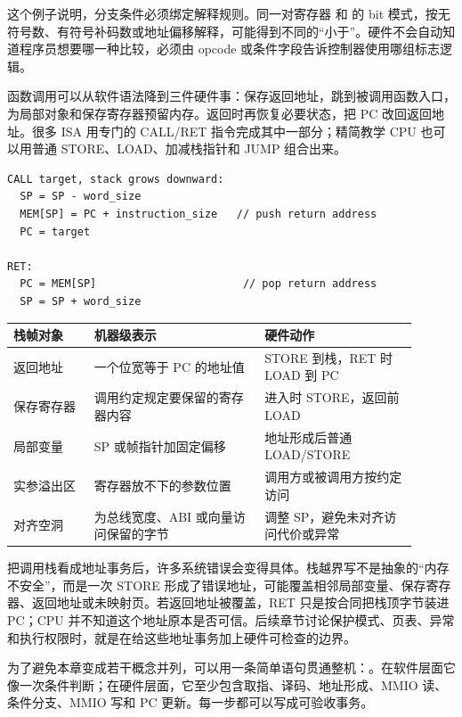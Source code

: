 这个例子说明，分支条件必须绑定解释规则。同一对寄存器  和  的 bit 模式，按无符号数、有符号补码数或地址偏移解释，可能得到不同的“小于”。硬件不会自动知道程序员想要哪一种比较，必须由 opcode 或条件字段告诉控制器使用哪组标志逻辑。

函数调用可以从软件语法降到三件硬件事：保存返回地址，跳到被调用函数入口，为局部对象和保存寄存器预留内存。返回时再恢复必要状态，把 PC 改回返回地址。很多 ISA 用专门的 CALL/RET 指令完成其中一部分；精简教学 CPU 也可以用普通 STORE、LOAD、加减栈指针和 JUMP 组合出来。

\begin{lstlisting}
CALL target, stack grows downward:
  SP = SP - word_size
  MEM[SP] = PC + instruction_size   // push return address
  PC = target

RET:
  PC = MEM[SP]                       // pop return address
  SP = SP + word_size
\end{lstlisting}

\begin{longtable}{L{0.18\linewidth}L{0.38\linewidth}L{0.34\linewidth}}
\toprule
栈帧对象 & 机器级表示 & 硬件动作 \\
\midrule
返回地址 & 一个位宽等于 PC 的地址值 & STORE 到栈，RET 时 LOAD 到 PC \\
保存寄存器 & 调用约定规定要保留的寄存器内容 & 进入时 STORE，返回前 LOAD \\
局部变量 & SP 或帧指针加固定偏移 & 地址形成后普通 LOAD/STORE \\
实参溢出区 & 寄存器放不下的参数位置 & 调用方或被调用方按约定访问 \\
对齐空洞 & 为总线宽度、ABI 或向量访问保留的字节 & 调整 SP，避免未对齐访问代价或异常 \\
\bottomrule
\end{longtable}

把调用栈看成地址事务后，许多系统错误会变得具体。栈越界写不是抽象的“内存不安全”，而是一次 STORE 形成了错误地址，可能覆盖相邻局部变量、保存寄存器、返回地址或未映射页。若返回地址被覆盖，RET 只是按合同把栈顶字节装进 PC；CPU 并不知道这个地址原本是否可信。后续章节讨论保护模式、页表、异常和执行权限时，就是在给这些地址事务加上硬件可检查的边界。

为了避免本章变成若干概念并列，可以用一条简单语句贯通整机：。在软件层面它像一次条件判断；在硬件层面，它至少包含取指、译码、地址形成、MMIO 读、条件分支、MMIO 写和 PC 更新。每一步都可以写成可验收事务。

